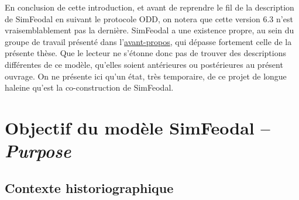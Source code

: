 En conclusion de cette introduction, et avant de reprendre le fil de la description de SimFeodal en suivant le protocole ODD, on notera que cette version 6.3 n'est vraisemblablement pas la dernière.
SimFeodal a une existence propre, au sein du groupe de travail présenté dans l'\hyperlink{avant-propos}{avant-propos}, qui dépasse fortement celle de la présente thèse.
Que le lecteur ne s'étonne donc pas de trouver des descriptions différentes de ce modèle, qu'elles soient antérieures ou postérieures au présent ouvrage.
On ne présente ici qu'un état, très temporaire, de ce projet de longue haleine qu'est la co-construction de SimFeodal.


\let\orisectionmark\sectionmark
\renewcommand\sectionmark[1]{}%
\section[Objectifs du modèle SimFeodal -- \large{\textit{Purpose}}]{Objectif du modèle SimFeodal -- \textit{Purpose}}
\orisectionmark{Objectifs}
\let\sectionmark\orisectionmark



\subsection{Contexte historiographique \label{subsec:contexte-historio}}

